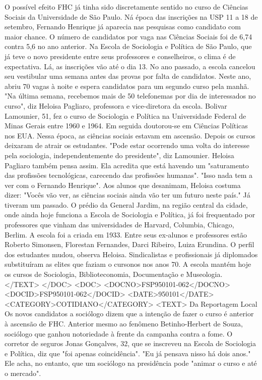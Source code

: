O possível efeito FHC já tinha sido discretamente sentido no curso de Ciências Sociais da Universidade de São Paulo. Ná época das inscrições na USP 11 a 18 de setembro, Fernando Henrique já aparecia nas pesquisas como candidato com maior chance. O número de candidatos por vaga nas Ciências Sociais foi de 6,74 contra 5,6 no ano anterior.
Na Escola de Sociologia e Política de São Paulo, que já teve o novo presidente entre seus professores e conselheiros, o clima é de expectativa. Lá, as inscrições vão até o dia 13.
No ano passado, a escola cancelou seu vestibular uma semana antes das provas por falta de candidatos. Neste ano, abriu 70 vagas à noite e espera candidatos para um segundo curso pela manhã.
"Na última semana, recebemos mais de 50 telefonemas por dia de interessados no curso", diz Heloisa Pagliaro, professora e vice-diretora da escola.
Bolivar Lamounier, 51, fez o curso de Sociologia e Política na Universidade Federal de Minas Gerais entre 1960 e 1964. Em seguida doutorou-se em Ciências Políticas nos EUA. Nessa época, as ciências sociais estavam em ascensão. Depois os cursos deixaram de atrair os estudantes.
"Pode estar ocorrendo uma volta do interesse pela sociologia, independentemente do presidente", diz Lamounier.
Heloisa Pagliaro também pensa assim. Ela acredita que está havendo um "saturamento das profissões tecnológicas, carecendo das profissões humanas". "Isso nada tem a ver com o Fernando Henrique".
Aos alunos que desanimam, Heloisa costuma dizer: "Vocês vão ver, as ciências sociais ainda vão ter um futuro neste país."
Já tiveram um passado. O prédio da General Jardim, na região central da cidade, onde ainda hoje funciona a Escola de Sociologia e Política, já foi frequentado por professores que vinham das universidades de Harvard, Columbia, Chicago, Berlim.
A escola foi a criada em 1933. Entre seus ex-alunos e professores estão Roberto Simonsen, Florestan Fernandes, Darci Ribeiro, Luiza Erundina.
O perfil dos estudantes mudou, observa Heloisa. Sindicalistas e profissionais já diplomados substituíram as elites que faziam o cursonos nos anos 70.
A escola mantém hoje os cursos de Sociologia, Biblioteconomia, Documentação e Museologia.
</TEXT>
</DOC>
<DOC>
<DOCNO>FSP950101-062</DOCNO>
<DOCID>FSP950101-062</DOCID>
<DATE>950101</DATE>
<CATEGORY>COTIDIANO</CATEGORY>
<TEXT>
Da Reportagem Local 
Os novos candidatos a sociólogo dizem que a intenção de fazer o curso é anterior à ascensão de FHC. Anterior mesmo ao fenômeno Betinho-Herbert de Souza, sociólogo que ganhou notoriedade à frente da campanha contra a fome.
O corretor de seguros Jonas Gonçalves, 32, que se inscreveu na Escola de Sociologia e Política, diz que "foi apenas coincidência". "Eu já pensava nisso há dois anos." Ele acha, no entanto, que um sociólogo na presidência pode "animar o curso e até o mercado".
